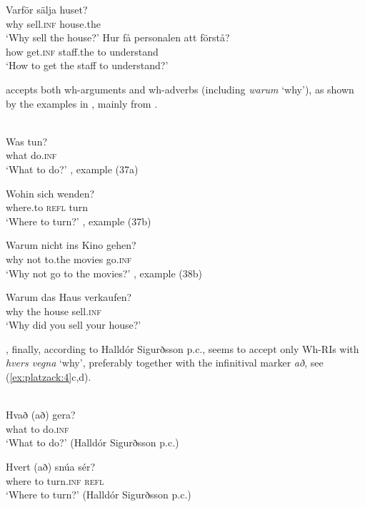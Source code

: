 \documentclass[output=paper]{LSP/langsci}
\begin{document}
   \ex
\gll Varför  sälja     huset?\\
      why    sell.\textsc{inf}  house.the\\
\glt   ‘Why sell the house?’
   \ex
\gll Hur få      personalen att förstå?   \\
      how get.\textsc{inf}   staff.the  to  understand   \\
\glt   ‘How to get the staff to understand?’ \citep[IV: 826--828]{TelemanEtAl1999}
\z
\z

 accepts both wh-arguments and wh-adverbs (including \textit{warum} ‘why’), as shown by the examples in , mainly from \citet{Reis2003}.

\ea%
    \label{ex:platzack:3} 
	    \\
   \ea
\gll Was   tun?                     \\
what  do.\textsc{inf}\\
\glt   ‘What to do?’   \citet{Reis2003}, example (37a)

   \ex
\gll Wohin    sich  wenden?           \\
      where.to  \textsc{refl}  turn\\
\glt   ‘Where to turn?’ \citet{Reis2003}, example (37b)

   \ex
\gll Warum  nicht  ins     Kino    gehen? \\
      why    not  to.the    movies   go.\textsc{inf}\\
\glt   ‘Why not go to the movies?’ \citet{Reis2003}, example (38b)

   \ex
\gll Warum  das  Haus    verkaufen?\\
      why    the  house    sell.\textsc{inf}\\
\glt   ‘Why did you sell your house?’
\z
\z

, finally, according to Halldór Sigurðsson p.c., seems to accept only Wh-RIs with \textit{hvers vegna} ‘why’, preferably together with the infinitival marker \textit{að}, see (\ref{ex:platzack:4}c,d). 

\ea%
    \label{ex:platzack:4}
	    \\
   \ea
\gll  *Hvað (að) gera?                   \\
       what    to  do.\textsc{inf}\\
\glt   ‘What to do?’ (Halldór Sigurðsson p.c.)

   \ex
\gll *Hvert (að) snúa     sér?               \\
      where  to  turn.\textsc{inf}  \textsc{refl}\\
\glt   ‘Where to turn?’ (Halldór Sigurðsson p.c.)
\end{document}
